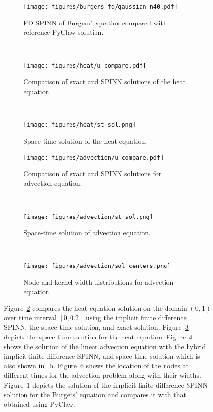 \documentclass[12pt]{article}
\begin{document}
\begin{figure}
\begin{subfigure}{0.32\textwidth}
\texttt{[image: figures/burgers\_fd/gaussian\_n40.pdf]}
\caption{FD-SPINN of Burgers' equation compared with reference PyClaw solution.}
\label{fig:burgers_comp}
\end{subfigure}
~
\begin{subfigure}{0.32\textwidth}
\texttt{[image: figures/heat/u\_compare.pdf]}
\caption{Comparison of exact and SPINN solutions of the heat equation.}
\label{fig:heat_eqn_compare}
\end{subfigure}
~
\begin{subfigure}{0.32\textwidth}
\texttt{[image: figures/heat/st\_sol.png]}
\caption{Space-time solution of the heat equation.}
\label{fig:heat_eqn_st_sol}
\end{subfigure}

\begin{subfigure}{0.32\textwidth}
\texttt{[image: figures/advection/u\_compare.pdf]}
\caption{Comparison of exact and SPINN solutions for advection equation.}
\label{fig:advection_comp}
\end{subfigure}
~
\begin{subfigure}{0.32\textwidth}
\texttt{[image: figures/advection/st\_sol.png]}
\caption{Space-time solution of advection equation.}
\label{fig:advection_st}
\end{subfigure}
~
\begin{subfigure}{0.32\textwidth}
\texttt{[image: figures/advection/sol\_centers.png]}
\caption{Node and kernel width distributions for advection equation.}
\label{fig:advection_nodes}
\end{subfigure}
\caption{Figure~\ref{fig:heat_eqn_compare} compares the heat equation solution on the domain $(0,1)$ over time interval $[0, 0.2]$ using the implicit finite difference SPINN, the space-time solution, and exact solution. Figure~\ref{fig:heat_eqn_st_sol} depicts the space time solution for the heat equation.  Figure~\ref{fig:advection_comp} shows the solution of the linear advection equation with the hybrid implicit finite difference SPINN, and space-time solution which is also shown in ~\ref{fig:advection_st}.  Figure~\ref{fig:advection_nodes} shows the location of the nodes at different times for the advection problem along with their widths.
Figure~\ref{fig:burgers_comp} depicts the solution of the implicit finite difference SPINN solution for the Burgers' equation and compares it with that obtained using PyClaw.}
\label{fig:time_varying}
\end{figure} 
\end{document}

